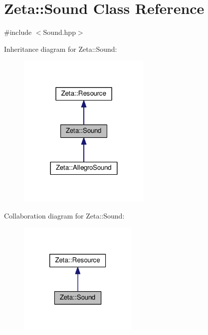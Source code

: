 \hypertarget{classZeta_1_1Sound}{\section{Zeta\+:\+:Sound Class Reference}
\label{classZeta_1_1Sound}
}


{\ttfamily \#include $<$Sound.\+hpp$>$}



Inheritance diagram for Zeta\+:\+:Sound\+:\nopagebreak
\begin{figure}[H]
\begin{center}
\leavevmode
\includegraphics[width=180pt]{classZeta_1_1Sound__inherit__graph}
\end{center}
\end{figure}


Collaboration diagram for Zeta\+:\+:Sound\+:\nopagebreak
\begin{figure}[H]
\begin{center}
\leavevmode
\includegraphics[width=162pt]{classZeta_1_1Sound__coll__graph}
\end{center}
\end{figure}
